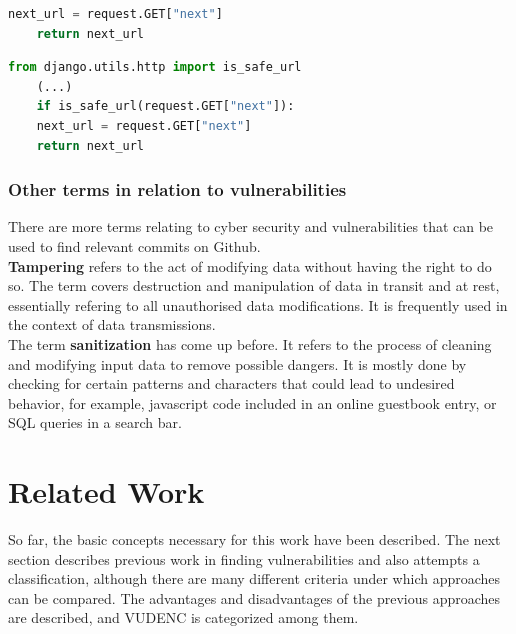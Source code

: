 \documentclass[
a4paper,
pagesize,
pdftex,
12pt,
ngerman,
fleqn,
final,
]{scrartcl}
\begin{document}
	\begin{lstlisting}[language=Python, showstringspaces=False]
	next_url = request.GET["next"]
	return next_url
	\end{lstlisting}
	
	\begin{lstlisting}[language=Python, showstringspaces=False]
	from django.utils.http import is_safe_url
	(...)
	if is_safe_url(request.GET["next"]):
	next_url = request.GET["next"]
	return next_url
	\end{lstlisting}
	
	
	\subsubsection{Other terms in relation to vulnerabilities}
	There are more terms relating to cyber security and vulnerabilities that can be used to find relevant commits on Github.\\
	\textbf{Tampering} refers to the act of modifying data without having the right to do so. The term covers destruction and manipulation of data in transit and at rest, essentially refering to all unauthorised data modifications. It is frequently used in the context of data transmissions.\\
	The term \textbf{sanitization} has come up before. It refers to the process of cleaning and modifying input data to remove possible dangers. It is mostly done by checking for certain patterns and characters that could lead to undesired behavior, for example, javascript code included in an online guestbook entry, or SQL queries in a search bar.\\
	
	\newpage

	\section{Related Work}\label{Related-Work}
	
	So far, the basic concepts necessary for this work have been described. The next section describes previous work in finding vulnerabilities and also attempts a classification, although there are many different criteria under which approaches can be compared. The advantages and disadvantages of the previous approaches are described, and VUDENC is categorized among them.
	
\end{document}
